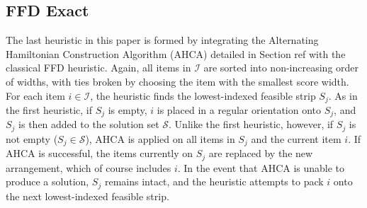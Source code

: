 \documentclass[oribibl]{llncs}
\begin{document}
\subsection{FFD Exact}
\label{sec:ffdexact}
The last heuristic in this paper is formed by integrating the Alternating Hamiltonian Construction Algorithm (AHCA) detailed in Section ref{} with the classical FFD heuristic. Again, all items in $\mathcal{I}$ are sorted into non-increasing order of widths, with ties broken by choosing the item with the smallest score width. For each item $i \in \mathcal{I}$, the heuristic finds the lowest-indexed feasible strip $S_j$. As in the first heuristic, if $S_j$ is empty, $i$ is placed in a regular orientation onto $S_j$, and $S_j$ is then added to the solution set $\mathcal{S}$. Unlike the first heuristic, however, if $S_j$ is not empty ($S_j \in \mathcal{S}$), AHCA is applied on all items in $S_j$ and the current item $i$. If AHCA is successful, the items currently on $S_j$ are replaced by the new arrangement, which of course includes $i$. In the event that AHCA is unable to produce a solution, $S_j$ remains intact, and the heuristic attempts to pack $i$ onto the next lowest-indexed feasible strip.





\end{document}
